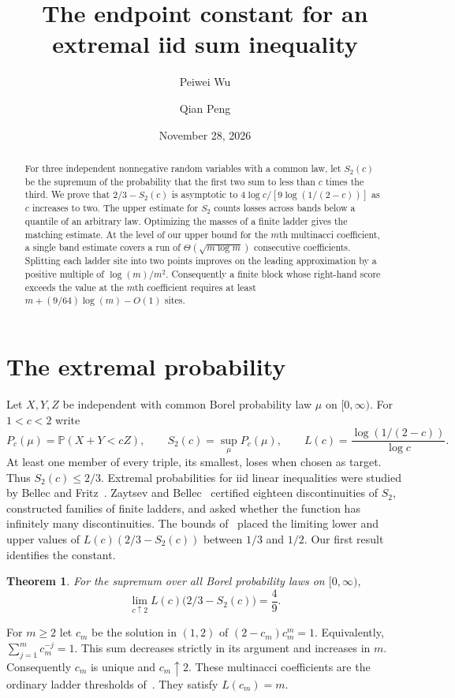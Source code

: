 \documentclass[11pt,reqno]{amsart}
\title[The endpoint constant for an extremal iid sum inequality]{The endpoint constant for an extremal iid sum inequality}
\author{Peiwei Wu}
\author{Qian Peng}
\date{November 28, 2026}
\newtheorem{theorem}{Theorem}[section]
\newcommand{\Prob}{\mathbb P}
\begin{document}
\begin{abstract}
For three independent nonnegative random variables with a common law, let
$S_2(c)$ be the supremum of the probability that the first two sum to
less than $c$ times the third. We prove that $2/3-S_2(c)$ is asymptotic
to $4\log c/[9\log(1/(2-c))]$ as $c$ increases to two.
The upper estimate for $S_2$ counts losses across bands below a quantile
of an arbitrary law. Optimizing the masses of a finite ladder gives the
matching estimate. At the level of our upper bound for the $m$th
multinacci coefficient, a single band estimate covers a run of
$\Theta(\sqrt{m\log m})$ consecutive coefficients.
Splitting each ladder site into two points improves on the leading approximation by a positive
multiple of $\log(m)/m^2$. Consequently a finite block whose
right-hand score exceeds the value at the $m$th coefficient requires
at least $m+(9/64)\log(m)-O(1)$ sites.
\end{abstract}
\maketitle

\section{The extremal probability}
Let $X,Y,Z$ be independent with common Borel probability law $\mu$ on
$[0,\infty)$. For $1<c<2$ write
\[
 P_c(\mu)=\Prob(X+Y<cZ),\qquad S_2(c)=\sup_\mu P_c(\mu),
 \qquad L(c)=\frac{\log(1/(2-c))}{\log c}.
\]
At least one member of every triple, its smallest, loses when chosen as
target. Thus $S_2(c)\le 2/3$. Extremal probabilities for iid linear
inequalities were studied by Bellec and Fritz~\cite{bf}. Zaytsev and
Bellec~\cite[\S\S6.1, 7.1.3]{zb} certified eighteen discontinuities of
$S_2$, constructed families of finite ladders, and asked whether the
function has infinitely many discontinuities. The bounds of~\cite{wp}
placed the limiting lower and upper values of $L(c)(2/3-S_2(c))$ between
$1/3$ and $1/2$. Our first result identifies the constant.

\begin{theorem}\label{th:limit}
For the supremum over all Borel probability laws on $[0,\infty)$,
\[
 \lim_{c\uparrow2}L(c)\bigl(2/3-S_2(c)\bigr)=\frac49.
\]
\end{theorem}

For $m\ge2$ let $c_m$ be the solution in $(1,2)$ of
$(2-c_m)c_m^m=1$. Equivalently, $\sum_{j=1}^m c_m^{-j}=1$.
This sum decreases strictly in its argument and increases in $m$.
Consequently $c_m$ is unique and $c_m\uparrow2$.
These multinacci coefficients are the ordinary ladder thresholds
of~\cite[\S6.1.7]{zb}. They satisfy $L(c_m)=m$.
\end{document}
